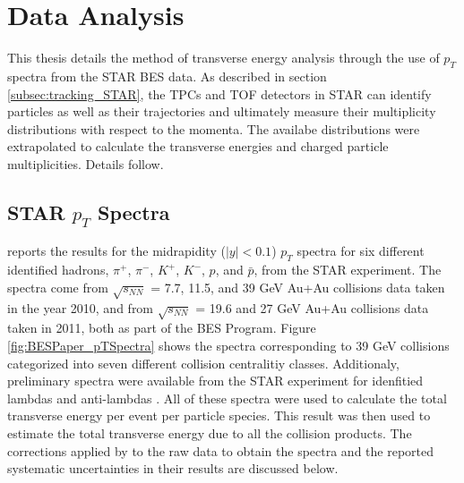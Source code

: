 \chapter{Data Analysis} \label{ch:analysis}
This thesis details the method of transverse energy analysis through the use of $p_{T}$ spectra from the STAR BES data. As described in section \ref{subsec:tracking_STAR}, the TPCs and TOF detectors in STAR can identify particles as well as their trajectories and ultimately measure their multiplicity distributions with respect to the momenta. The availabe distributions were extrapolated to calculate the transverse energies and charged particle multiplicities. Details follow.

\section{STAR $p_{T}$ Spectra}
\citet{PhysRevC.96.044904} reports the results for the midrapidity ($\left|{y}\right| < 0.1$) $p_{T}$ spectra for six different identified hadrons, $\pi^+$, $\pi^-$, $K^+$, $K^-$, $p$, and $\bar{p}$, from the STAR experiment. The spectra come from $\sqrt{s_{NN}}$ = 7.7, 11.5, and 39 GeV Au+Au collisions data taken in the year 2010, and from $\sqrt{s_{NN}}$ = 19.6 and 27 GeV Au+Au collisions data taken in 2011, both as part of the BES Program. Figure \ref{fig:BESPaper_pTSpectra} \cite{PhysRevC.96.044904} shows the spectra corresponding to 39 GeV collisions categorized into seven different collision centralitiy classes. Additionaly, preliminary spectra were available from the STAR experiment for idenfitied lambdas and anti-lambdas \cite{YePrivateCommunication}. All of these spectra were used to calculate the total transverse energy per event per particle species. This result was then used to estimate the total transverse energy due to all the collision products. The corrections applied by \citet{PhysRevC.96.044904} to the raw data to obtain the spectra and the reported systematic uncertainties in their results are discussed below.
